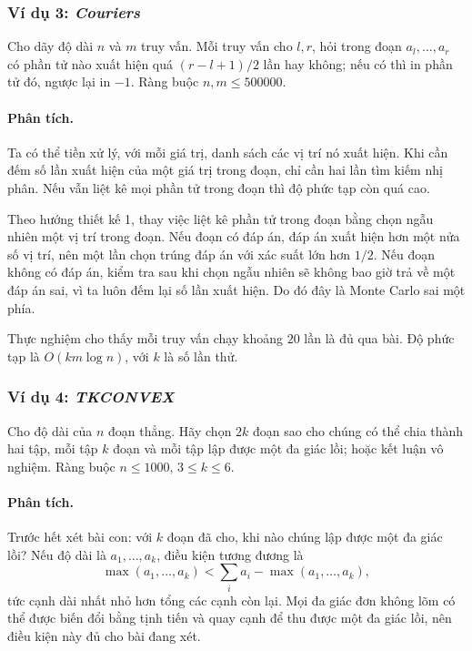 \documentclass[11pt]{article}
\begin{document}
\subsubsection{Ví dụ 3: \emph{Couriers}}

Cho dãy độ dài \(n\) và \(m\) truy vấn. Mỗi truy vấn cho \(l,r\), hỏi trong đoạn
\(a_l,\ldots,a_r\) có phần tử nào xuất hiện quá
\((r-l+1)/2\) lần hay không; nếu có thì in phần tử đó, ngược lại in \(-1\).
Ràng buộc \(n,m\le 500000\).

\paragraph{Phân tích.}
Ta có thể tiền xử lý, với mỗi giá trị, danh sách các vị trí nó xuất hiện. Khi
cần đếm số lần xuất hiện của một giá trị trong đoạn, chỉ cần hai lần tìm kiếm
nhị phân. Nếu vẫn liệt kê mọi phần tử trong đoạn thì độ phức tạp còn quá cao.

Theo hướng thiết kế 1, thay việc liệt kê phần tử trong đoạn bằng chọn ngẫu nhiên
một vị trí trong đoạn. Nếu đoạn có đáp án, đáp án xuất hiện hơn một nửa số vị
trí, nên một lần chọn trúng đáp án với xác suất lớn hơn \(1/2\). Nếu đoạn không
có đáp án, kiểm tra sau khi chọn ngẫu nhiên sẽ không bao giờ trả về một đáp án
sai, vì ta luôn đếm lại số lần xuất hiện. Do đó đây là Monte Carlo sai một
phía.

Thực nghiệm cho thấy mỗi truy vấn chạy khoảng \(20\) lần là đủ qua bài. Độ phức
tạp là \(O(km\log n)\), với \(k\) là số lần thử.

\subsubsection{Ví dụ 4: \emph{TKCONVEX}}

Cho độ dài của \(n\) đoạn thẳng. Hãy chọn \(2k\) đoạn sao cho chúng có thể chia
thành hai tập, mỗi tập \(k\) đoạn và mỗi tập lập được một đa giác lồi; hoặc kết
luận vô nghiệm. Ràng buộc \(n\le 1000\), \(3\le k\le 6\).

\paragraph{Phân tích.}
Trước hết xét bài con: với \(k\) đoạn đã cho, khi nào chúng lập được một đa giác
lồi? Nếu độ dài là \(a_1,\ldots,a_k\), điều kiện tương đương là
\[
  \max(a_1,\ldots,a_k) < \sum_i a_i-\max(a_1,\ldots,a_k),
\]
tức cạnh dài nhất nhỏ hơn tổng các cạnh còn lại. Mọi đa giác đơn không lõm có
thể được biến đổi bằng tịnh tiến và quay cạnh để thu được một đa giác lồi, nên
điều kiện này đủ cho bài đang xét.
\end{document}

